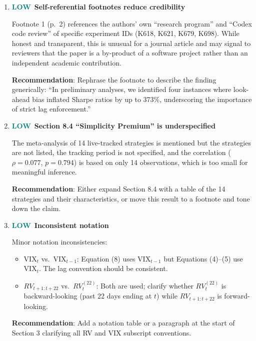 \documentclass[12pt,a4paper]{article}
\newcommand{\LOW}{\textcolor{teal}{\textbf{LOW}}}
\begin{document}
\begin{enumerate}[label=D8.\arabic*]

\item \LOW\ \textbf{Self-referential footnotes reduce credibility}

Footnote 1 (p.~2) references the authors' own ``research program'' and ``Codex code review'' of specific experiment IDs (K618, K621, K679, K698). While honest and transparent, this is unusual for a journal article and may signal to reviewers that the paper is a by-product of a software project rather than an independent academic contribution.

\textbf{Recommendation}: Rephrase the footnote to describe the finding generically: ``In preliminary analyses, we identified four instances where look-ahead bias inflated Sharpe ratios by up to 373\%, underscoring the importance of strict lag enforcement.''

\item \LOW\ \textbf{Section 8.4 ``Simplicity Premium'' is underspecified}

The meta-analysis of 14 live-tracked strategies is mentioned but the strategies are not listed, the tracking period is not specified, and the correlation ($\rho = 0.077$, $p = 0.794$) is based on only 14 observations, which is too small for meaningful inference.

\textbf{Recommendation}: Either expand Section 8.4 with a table of the 14 strategies and their characteristics, or move this result to a footnote and tone down the claim.

\item \LOW\ \textbf{Inconsistent notation}

Minor notation inconsistencies:
\begin{itemize}
    \item $\text{VIX}_t$ vs.\ $\text{VIX}_{t-1}$: Equation (8) uses $\text{VIX}_{t-1}$ but Equations (4)--(5) use $\text{VIX}_t$. The lag convention should be consistent.
    \item $RV_{t+1:t+22}$ vs.\ $RV_t^{(22)}$: Both are used; clarify whether $RV_t^{(22)}$ is backward-looking (past 22 days ending at $t$) while $RV_{t+1:t+22}$ is forward-looking.
\end{itemize}
\textbf{Recommendation}: Add a notation table or a paragraph at the start of Section 3 clarifying all RV and VIX subscript conventions.

\end{enumerate}


\end{document}
